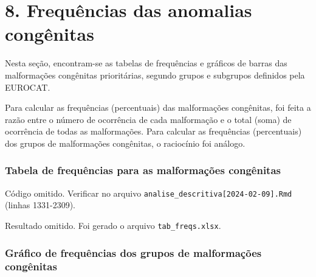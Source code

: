\documentclass[
]{article}
\begin{document}
\newpage

\hypertarget{frequuxeancias-das-anomalias-conguxeanitas}{%
\section{8. Frequências das anomalias
congênitas}\label{frequuxeancias-das-anomalias-conguxeanitas}}

Nesta seção, encontram-se as tabelas de frequências e gráficos de barras
das malformações congênitas prioritárias, segundo grupos e subgrupos
definidos pela EUROCAT.

Para calcular as frequências (percentuais) das malformações congênitas,
foi feita a razão entre o número de ocorrência de cada malformação e o
total (soma) de ocorrência de todas as malformações. Para calcular as
frequências (percentuais) dos grupos de malformações congênitas, o
raciocínio foi análogo.

\hypertarget{tabela-de-frequuxeancias-para-as-malformauxe7uxf5es-conguxeanitas}{%
\subsubsection{Tabela de frequências para as malformações
congênitas}\label{tabela-de-frequuxeancias-para-as-malformauxe7uxf5es-conguxeanitas}}

Código omitido. Verificar no arquivo
\texttt{analise\_descritiva{[}2024-02-09{]}.Rmd} (linhas 1331-2309).

Resultado omitido. Foi gerado o arquivo \texttt{tab\_freqs.xlsx}.

\hypertarget{gruxe1fico-de-frequuxeancias-dos-grupos-de-malformauxe7uxf5es-conguxeanitas}{%
\subsubsection{Gráfico de frequências dos grupos de malformações
congênitas}\label{gruxe1fico-de-frequuxeancias-dos-grupos-de-malformauxe7uxf5es-conguxeanitas}}
\end{document}
